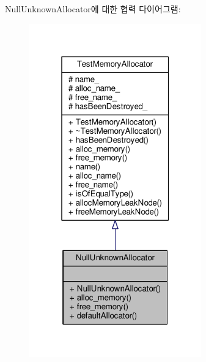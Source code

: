 Null\+Unknown\+Allocator에 대한 협력 다이어그램\+:
\nopagebreak
\begin{figure}[H]
\begin{center}
\leavevmode
\includegraphics[width=211pt]{class_null_unknown_allocator__coll__graph}
\end{center}
\end{figure}
